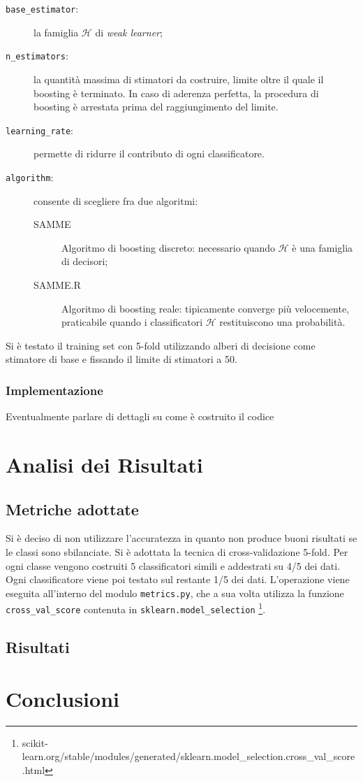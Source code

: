 \documentclass[12pt,a4paper,oneside,hidelinks]{report}
\begin{document}
\begin{description}
\item[\texttt{base\_estimator}:]la famiglia $ \mathcal{H} $ di \emph{weak learner};
\item[\texttt{n\_estimators}:]la quantità massima di stimatori da costruire, limite oltre il quale il boosting è terminato.
In caso di aderenza perfetta, la procedura di boosting è arrestata prima del raggiungimento del limite.
\item[\texttt{learning\_rate}:] permette di ridurre il contributo di ogni classificatore.
\item[\texttt{algorithm}:]consente di scegliere fra due algoritmi:
\begin{description}
\item[SAMME]Algoritmo di boosting discreto: necessario quando $ \mathcal{H} $ è una famiglia di decisori;
\item[SAMME.R]Algoritmo di boosting reale: tipicamente converge più velocemente, praticabile quando i classificatori $ \mathcal{H} $ restituiscono una probabilità.
\end{description}
\end{description}
 
Si è testato il training set con 5-fold utilizzando alberi di decisione come stimatore di base e fissando il limite di stimatori a 50.

\subsection{Implementazione}
Eventualmente parlare di dettagli su come è costruito il codice

\chapter{Analisi dei Risultati}
\label{chap:risultati}

\section{Metriche adottate}
Si è deciso di non utilizzare l'accuratezza in quanto non produce buoni risultati se le classi sono sbilanciate.  
Si è adottata la tecnica di cross-validazione 5-fold. Per ogni classe vengono costruiti 5 classificatori simili e addestrati su 4/5 dei dati. Ogni classificatore viene poi testato sul restante 1/5 dei dati.
L'operazione viene eseguita all'interno del modulo \texttt{metrics.py}, 
che a sua volta utilizza la funzione \texttt{cross\_val\_score} contenuta in 
\texttt{sklearn.model\_selection} 
\footnote{scikit-learn.org/stable/modules/generated/sklearn.model\_selection.cross\_val\_score.html}. 

\section{Risultati}

\chapter{Conclusioni}
\end{document}
